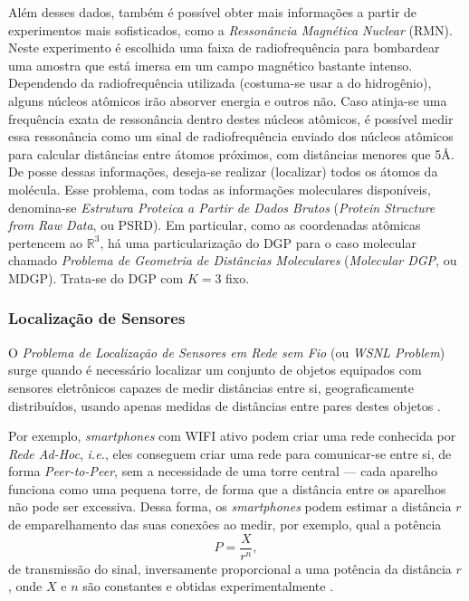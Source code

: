 Além desses dados, também é possível obter mais informações a partir de experimentos mais sofisticados, como a \textit{Ressonância Magnética Nuclear} (RMN). Neste experimento é escolhida uma faixa de radiofrequência para bombardear uma amostra que está imersa em um campo magnético bastante intenso. Dependendo da radiofrequência utilizada (costuma-se usar a do hidrogênio), alguns núcleos atômicos irão absorver energia e outros não. Caso atinja-se uma frequência exata de ressonância dentro destes núcleos atômicos, é possível medir essa ressonância como um sinal de radiofrequência enviado dos núcleos atômicos para calcular distâncias entre átomos próximos, com distâncias menores que 5\AA.
\\

De posse dessas informações, deseja-se realizar (localizar) todos os átomos da molécula. Esse problema, com todas as informações moleculares disponíveis, denomina-se \textit{Estrutura Proteica a Partir de Dados Brutos} (\textit{Protein Structure from Raw Data}, ou PSRD). 
Em particular, como as coordenadas atômicas pertencem ao $\mathbb{R}^3$, há uma particularização do DGP para o caso molecular chamado \textit{Problema de Geometria de Distâncias Moleculares} (\textit{Molecular DGP}, ou MDGP). Trata-se do DGP com $K = 3$ fixo.

\subsubsection{Localização de Sensores}

O \textit{Problema de Localização de Sensores em Rede sem Fio} (ou \textit{WSNL Problem}) surge quando é necessário localizar um conjunto de objetos equipados com sensores eletrônicos capazes de medir distâncias entre si, geograficamente distribuídos, usando apenas medidas de distâncias entre pares destes objetos \cite{yemini1978positioning}. 

Por exemplo, \textit{smartphones} com WIFI ativo podem criar uma rede conhecida por \textit{Rede Ad-Hoc}, \textit{i.e.}, eles conseguem criar uma rede para comunicar-se entre si, de forma \textit{Peer-to-Peer}, sem a necessidade de uma torre central --- cada aparelho funciona como uma pequena torre, de forma que a distância entre os aparelhos não pode ser excessiva.
Dessa forma, os \textit{smartphones} podem estimar a distância $r$ de emparelhamento das suas conexões ao medir, por exemplo, qual a potência
\begin{equation}
	P = \frac{X}{r^n},
\end{equation}
de transmissão do sinal, inversamente proporcional a uma potência da distância $r$, onde $X$ e $n$ são constantes e obtidas experimentalmente \cite{savvides2001dynamic}.

